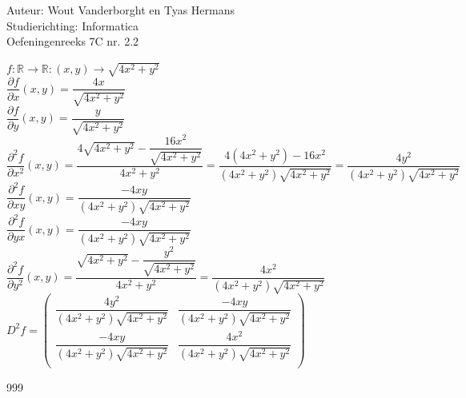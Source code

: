 \documentclass[a4paper]{article}
\newcommand{\R}{\mathbb{R}}
\begin{document}
  
\noindent \large Auteur: Wout Vanderborght en Tyas Hermans \\
\noindent \large Studierichting: Informatica\\
\noindent \large Oefeningenreeks 7C nr. 2.2\\

\medskip

\normalsize

$ f:\R \rightarrow \R: (x, y) \rightarrow \sqrt{4x^2 + y^2} $ \\

$ \dfrac{\partial f}{\partial x} (x, y) = \dfrac{4x}{\sqrt{4x^2 + y^2}} $ \\

$ \dfrac{\partial f}{\partial y} (x, y) = \dfrac{y}{\sqrt{4x^2 + y^2}} $ \\

$ \dfrac{\partial^2 f}{\partial x^2} (x, y) = \dfrac{4\sqrt{4x^2 + y^2} - \dfrac{16x^2}{\sqrt{4x^2 + y^2}}}{4x^2 + y^2} = \dfrac{4(4x^2+y^2) - 16x^2}{(4x^2+y^2)\sqrt{4x^2+y^2}} = \dfrac{4y^2}{(4x^2+y^2)\sqrt{4x^2+y^2}} $ \\

$ \dfrac{\partial^2 f}{\partial xy} (x, y) = \dfrac{-4xy}{(4x^2+y^2)\sqrt{4x^2+y^2}} $ \\

$ \dfrac{\partial^2 f}{\partial yx} (x, y) = \dfrac{-4xy}{(4x^2+y^2)\sqrt{4x^2+y^2}} $ \\

$ \dfrac{\partial^2 f}{\partial y^2} (x, y) = \dfrac{\sqrt{4x^2+y^2} - \dfrac{y^2}{\sqrt{4x^2+y^2}}}{4x^2+y^2} = \dfrac{4x^2}{(4x^2+y^2)\sqrt{4x^2+y^2}} $ \\

$ D^2 f = \left( \begin{array}{cc}
    \dfrac{4y^2}{(4x^2+y^2)\sqrt{4x^2+y^2}} & \dfrac{-4xy}{(4x^2+y^2)\sqrt{4x^2+y^2}} \\
    \dfrac{-4xy}{(4x^2+y^2)\sqrt{4x^2+y^2}} & \dfrac{4x^2}{(4x^2+y^2)\sqrt{4x^2+y^2}} \\
\end{array} \right) $

\begin{thebibliography}{999}
\end{thebibliography}
\end{document}
